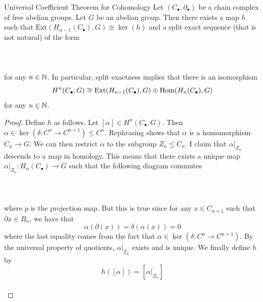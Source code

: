 \documentclass[a4paper]{article}
\begin{document}
\begin{thm}{Universal Coefficient Theorem for Cohomology}{} Let $(C_\bullet,\partial_\bullet)$ be a chain complex of free abelian groups. Let $G$ be an abelian group. Then there exists a map $h$ such that $\text{Ext}(H_{n-1}(C_\bullet),G)\cong\ker(h)$ and a split exact sequence (that is not natural) of the form \\~\\
\\~\\
for any $n\in\mathbb{N}$. In particular, split exactness implies that there is an isomorphism $$H^n(C_\bullet;G)\cong\text{Ext}(H_{n-1}(C_\bullet),G)\oplus\operatorname{Hom}(H_n(C_\bullet),G)$$ for any $n\in\mathbb{N}$. \tcbline
\begin{proof}
Define $h$ as follows. Let $[\alpha]\in H^n(C_\bullet,G)$. Then $\alpha\in\ker(\delta:C^n\to C^{n+1})\leq C^n$. Rephrasing shows that $\alpha$ is a homomorphism $C_n\to G$. We can then restrict $\alpha$ to the subgroup $Z_n\leq C_n$. I claim that $\alpha|_{Z_n}$ descends to a map in homology. This means that there exists a unique map $\overline{\alpha|_{Z_n}}:H_n(C_\bullet)\to G$ such that the following diagram commutes \\~\\
\\~\\
where $p$ is the projection map. But this is true since for any $x\in C_{n+1}$ such that $\partial x\in B_n$, we have that $$\alpha(\partial(x))=\delta(\alpha(x))=0$$ where the last equality comes from the fact that $\alpha\in\ker(\delta:C^n\to C^{n+1})$. By the universal property of quotients, $\overline{\alpha|_{Z_n}}$ exists and is unique. We finally define $h$ by $$h([\alpha])=\left[\overline{\alpha|_{Z_n}}\right]$$~\\


\end{proof}
\end{thm}
\end{document}
